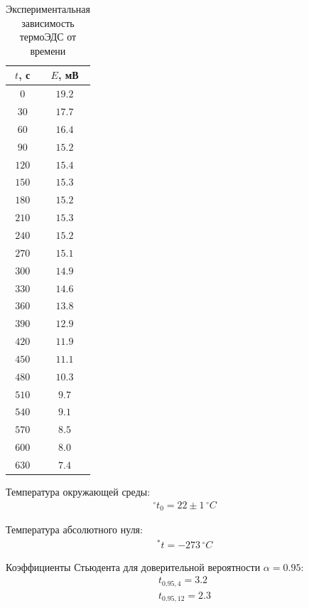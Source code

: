 \documentclass{article}
\begin{document}
\begin{table}[h!]
   \centering
   \begin{tabular}{|c|c|} \hline
       $t$, с & $E$, мВ\\ \hline
        $ 0 $ & $19.2$ \\ \hline
        $30 $ & $17.7$ \\ \hline
        $60 $ & $16.4$ \\ \hline
        $90 $ & $15.2$ \\ \hline
        $120$ & $15.4$ \\ \hline
        $150$ & $15.3$ \\ \hline
        $180$ & $15.2$ \\ \hline
        $210$ & $15.3$ \\ \hline
        $240$ & $15.2$ \\ \hline
        $270$ & $15.1$ \\ \hline
        $300$ & $14.9$ \\ \hline
        $330$ & $14.6$ \\ \hline
        $360$ & $13.8$ \\ \hline
        $390$ & $12.9$ \\ \hline
        $420$ & $11.9$ \\ \hline
        $450$ & $11.1$ \\ \hline
        $480$ & $10.3$ \\ \hline
        $510$ & $ 9.7$ \\ \hline
        $540$ & $ 9.1$ \\ \hline
        $570$ & $ 8.5$ \\ \hline
        $600$ & $ 8.0$ \\ \hline
        $630$ & $ 7.4$ \\ \hline
   \end{tabular}
   \caption{Экспериментальная зависимость термоЭДС от времени}
\end{table}

Температура окружающей среды:
\begin{gather*}
    ^\circ t_0 = 22 \pm 1\, ^\circ C
\end{gather*}

Температура абсолютного нуля:
\begin{gather*}
    ^*t = -273\, ^\circ C
\end{gather*}

Коэффициенты Стьюдента для доверительной вероятности $\alpha=0.95$:
\begin{gather*}
    t_{ 0.95, 4} = 3.2\\
    t_{ 0.95, 12} = 2.3\\
\end{gather*}
\end{document}
